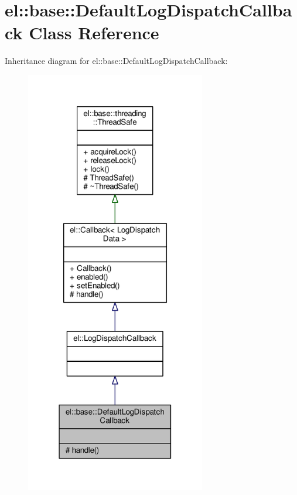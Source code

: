 \hypertarget{classel_1_1base_1_1DefaultLogDispatchCallback}{}\section{el\+:\+:base\+:\+:Default\+Log\+Dispatch\+Callback Class Reference}
\label{classel_1_1base_1_1DefaultLogDispatchCallback}


Inheritance diagram for el\+:\+:base\+:\+:Default\+Log\+Dispatch\+Callback\+:
\nopagebreak
\begin{figure}[H]
\begin{center}
\leavevmode
\includegraphics[width=223pt]{dc/d20/classel_1_1base_1_1DefaultLogDispatchCallback__inherit__graph}
\end{center}
\end{figure}


